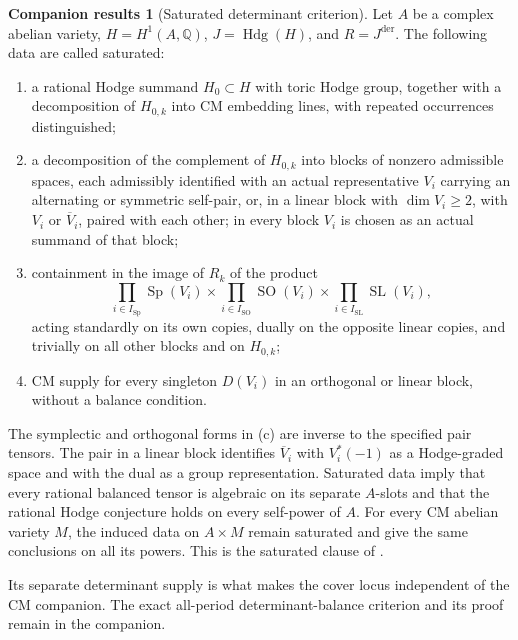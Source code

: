 \documentclass[11pt]{article}
\newcommand{\Q}{\mathbb Q}
\theoremstyle{plain}
\theoremstyle{definition}
\newtheorem{companionresults}[theorem]{Companion results}
\theoremstyle{remark}
\numberwithin{equation}{section}
\begin{document}
\begin{companionresults}[Saturated determinant criterion]
\label{comp:saturated}
Let \(A\) be a complex
abelian variety, \(H=H^1(A,\Q)\), \(J=\operatorname{Hdg}(H)\), and
\(R=J^{\mathrm{der}}\).  The following data are called saturated:
\begin{enumerate}[label=\textnormal{(\alph*)}]
\item a rational Hodge summand \(H_0\subset H\) with toric Hodge group,
together with a decomposition of \(H_{0,k}\) into CM embedding lines,
with repeated occurrences distinguished;
\item a decomposition of the complement of \(H_{0,k}\) into blocks of
nonzero admissible spaces, each admissibly identified with an actual
representative \(V_i\) carrying an alternating or symmetric self-pair,
or, in a linear block with \(\dim V_i\geq2\), with \(V_i\) or
\(\overline V_i\), paired with each other; in every block \(V_i\) is
chosen as an actual summand of that block;
\item containment in the image of \(R_k\) of the product
\[
 \prod_{i\in I_{\mathrm{Sp}}}\operatorname{Sp}(V_i)
 \times\prod_{i\in I_{\mathrm{SO}}}\operatorname{SO}(V_i)
 \times\prod_{i\in I_{\mathrm{SL}}}\operatorname{SL}(V_i),
\]
acting standardly on its own copies, dually on the opposite linear
copies, and trivially on all other blocks and on \(H_{0,k}\);
\item CM supply for every singleton \(D(V_i)\) in an orthogonal or
linear block, without a balance condition.
\end{enumerate}
The symplectic and orthogonal forms in \textnormal{(c)} are inverse to
the specified pair tensors.  The pair in a linear block identifies
\(\overline V_i\) with \(V_i^*(-1)\) as a Hodge-graded space and with
the dual as a group representation.  Saturated data imply that every
rational balanced tensor is algebraic on its separate \(A\)-slots and
that the rational Hodge conjecture holds on every self-power of \(A\).
For every CM abelian variety \(M\), the induced data on \(A\times M\)
remain saturated and give the same conclusions on all its powers.
This is the saturated clause of
\cite[Theorem~2.5]{OpenAIAbelianPowers}.
\end{companionresults}

Its separate determinant supply is what makes the cover locus
independent of the CM companion.  The exact all-period
determinant-balance criterion and its proof remain in the companion.
\end{document}
